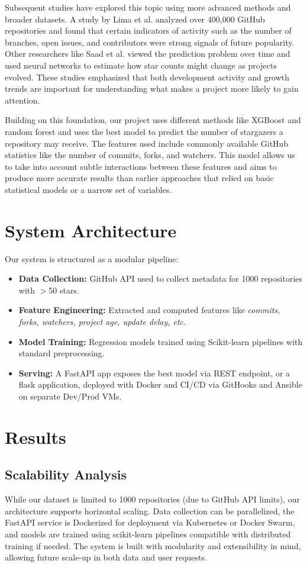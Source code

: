 \documentclass[12pt,a4paper]{article}
\begin{document}
Subsequent studies have explored this topic using more advanced methods and broader datasets. A study by Lima et al.\cite{1} analyzed over 400{,}000 GitHub repositories and found that certain indicators of activity such as the number of branches, open issues, and contributors were strong signals of future popularity. Other researchers like Saad et al.\cite{2} viewed the prediction problem over time and used neural networks to estimate how star counts might change as projects evolved. These studies emphasized that both development activity and growth trends are important for understanding what makes a project more likely to gain attention. 

Building on this foundation, our project uses different methods like XGBoost and random forest and uses the best model to predict the number of stargazers a repository may receive. The features used include commonly available GitHub statistics like the number of commits, forks, and watchers. This model allows us to take into account subtle interactions between these features and aims to produce more accurate results than earlier approaches that relied on basic statistical models or a narrow set of variables\cite{3}.

\section{System Architecture}
Our system is structured as a modular pipeline:
\begin{itemize}
    \item \textbf{Data Collection:} GitHub API used to collect metadata for 1000 repositories with $>$50 stars.
    \item \textbf{Feature Engineering:} Extracted and computed features like \textit{commits, forks, watchers, project age, update delay, etc.}
    \item \textbf{Model Training:} Regression models trained using Scikit-learn pipelines with standard preprocessing.
    \item \textbf{Serving:} A FastAPI app exposes the best model via REST endpoint, or a flask application, deployed with Docker and CI/CD via GitHooks and Ansible on separate Dev/Prod VMs.
\end{itemize}

\section{Results}
\subsection{Scalability Analysis}
While our dataset is limited to 1000 repositories (due to GitHub API limits), our architecture supports horizontal scaling. Data collection can be parallelized, the FastAPI service is Dockerized for deployment via Kubernetes or Docker Swarm, and models are trained using scikit-learn pipelines compatible with distributed training if needed. The system is built with modularity and extensibility in mind, allowing future scale-up in both data and user requests.
\end{document}
